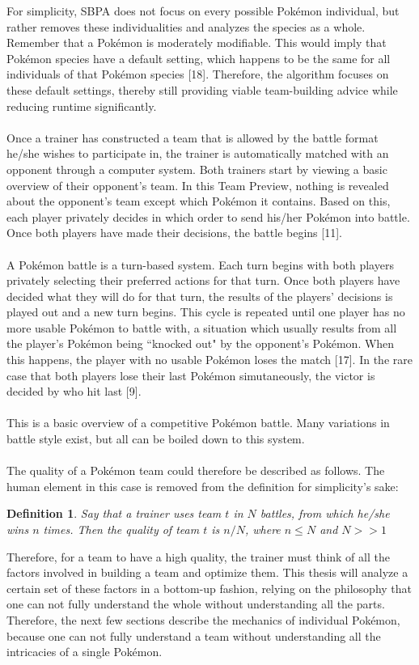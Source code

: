 \documentclass{article}
\newtheorem{definition}{Definition}
\begin{document}
For simplicity, SBPA does not focus on every possible Pok\'emon individual, but rather removes these individualities and analyzes the species as a whole. Remember that a Pok\'emon is moderately modifiable. This would imply that Pok\'emon species have a default setting, which happens to be the same for all individuals of that Pok\'emon species [18]. Therefore, the algorithm focuses on these default settings, thereby still providing viable team-building advice while reducing runtime significantly.\\\\
Once a trainer has constructed a team that is allowed by the battle format he/she wishes to participate in, the trainer is automatically matched with an opponent through a computer system. Both trainers start by viewing a basic overview of their opponent's team. In this Team Preview, nothing is revealed about the opponent's team except which Pok\'emon it contains. Based on this, each player privately decides in which order to send his/her Pok\'emon into battle. Once both players have made their decisions, the battle begins [11].\\\\
A Pok\'emon battle is a turn-based system. Each turn begins with both players privately selecting their preferred actions for that turn. Once both players have decided what they will do for that turn, the results of the players' decisions is played out and a new turn begins. This cycle is repeated until one player has no more usable Pok\'emon to battle with, a situation which usually results from all the player's Pok\'emon being ``knocked out" by the opponent's Pok\'emon. When this happens, the player with no usable Pok\'emon loses the match [17]. In the rare case that both players lose their last Pok\'emon simutaneously, the victor is decided by who hit last [9].\\\\
This is a basic overview of a competitive Pok\'emon battle. Many variations in battle style exist, but all can be boiled down to this system.\\\\
The quality of a Pok\'emon team could therefore be described as follows. The human element in this case is removed from the definition for simplicity's sake:
\begin{definition}\label{QualityDef}
	Say that a trainer uses team $t$ in $N$ battles, from which he/she wins $n$ times. Then the quality of team $t$ is $n/N$, where $n\le N$ and $N>\!>1$ 
\end{definition}
Therefore, for a team to have a high quality, the trainer must think of all the factors involved in building a team and optimize them. This thesis will analyze a certain set of these factors in a bottom-up fashion, relying on the philosophy that one can not fully understand the whole without understanding all the parts. Therefore, the next few sections describe the mechanics of individual Pok\'emon, because one can not fully understand a team without understanding all the intricacies of a single Pok\'emon.
\end{document}
